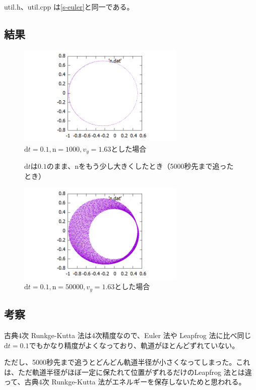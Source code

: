 \documentclass[a4paper,twoside]{jarticle}
\begin{document}
util.h、util.cpp は\ref{s-euler}と同一である。

\subsection{結果}
\begin{figure}[H]
\begin{center}
\includegraphics[width=8cm]{../cpp/out/runge-kutta/n.png}
\end{center}
\caption{$\mathrm{d}t=0.1, \mathrm{n}=1000, v_y=1.63$とした場合}
\end{figure}

\begin{figure}[H]
$\mathrm{d}t$は$0.1$のまま、nをもう少し大きくしたとき（5000秒先まで追ったとき）
\begin{center}
\includegraphics[width=8cm]{../cpp/out/runge-kutta/n_dt=e-1_n=50000.png}
\end{center}
\caption{$\mathrm{d}t=0.1, \mathrm{n}=50000, v_y=1.63$とした場合}
\end{figure}

\subsection{考察}
古典4次 Runkge-Kutta 法は4次精度なので、Euler 法や Leapfrog 法に比べ同じ$\mathrm{d}t=0.1$でもかなり精度がよくなっており、軌道がほとんどずれていない。

ただし、5000秒先まで追うとどんどん軌道半径が小さくなってしまった。これは、ただ軌道半径がほぼ一定に保たれて位置がずれるだけのLeapfrog 法とは違って、古典4次 Runkge-Kutta 法がエネルギーを保存しないためと思われる。
\end{document}
